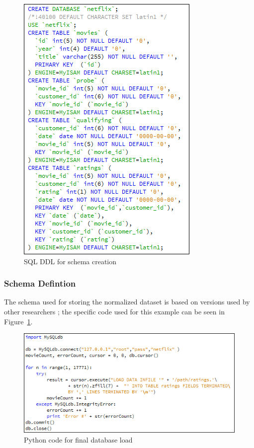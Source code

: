 \documentclass[prodmode,acmtecs]{acmsmall}
\begin{document}
\begin{figure}
\centerline{\includegraphics[scale=.7]{01schema.png}}
\caption{SQL DDL for schema creation}
\label{fig:one}
\end{figure}

\subsubsection{Schema Defintion}
The schema used for storing the normalized dataset is based on versions used by other researchers \cite{igvita-01}; the specific code used for this example can be seen in Figure~\ref{fig:one}.

\begin{figure}
\centerline{\includegraphics[scale=.7]{04load.png}}
\caption{Python code for final database load}
\label{fig:two}
\end{figure}
\end{document}
